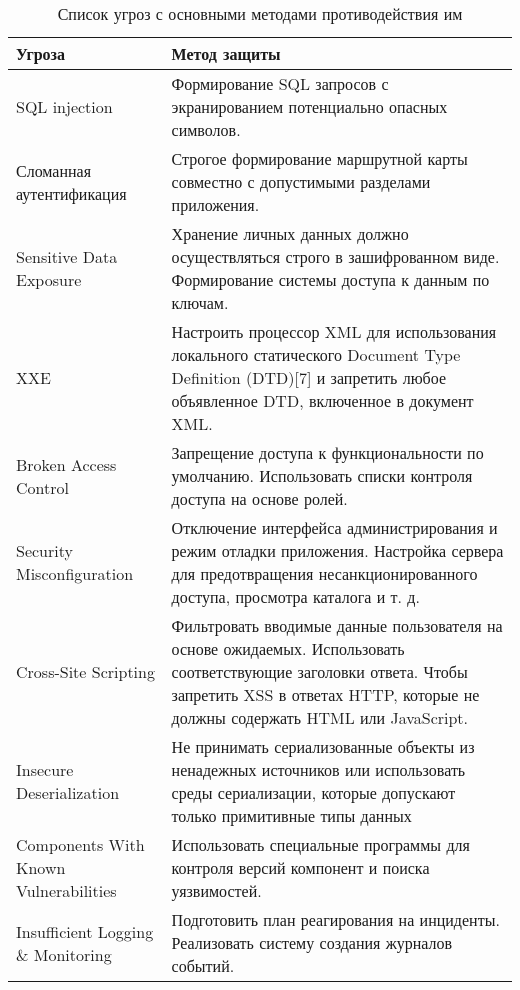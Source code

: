 \begin{table}
	\caption{Список угроз с основными методами противодействия им}
	\label{listOfRisk}
	\begin{tabularx}{\linewidth}{|p{4cm}|X|}
		\hline
		Угроза & Метод защиты \\
		\hline
		SQL injection & Формирование SQL запросов с экранированием потенциально опасных символов. \\
		\hline
		Сломанная аутентификация & Строгое формирование маршрутной карты совместно с допустимыми разделами приложения. \\
		\hline
		Sensitive Data Exposure & Хранение личных данных должно осуществляться строго в зашифрованном виде. Формирование системы доступа к данным по ключам. \\
		\hline
		XXE & Настроить процессор XML для использования локального статического Document Type Definition (DTD)[7] и запретить любое объявленное DTD, включенное в документ XML. \\
		\hline
		Broken Access Control & Запрещение доступа к функциональности по умолчанию. Использовать списки контроля доступа на основе ролей. \\
		\hline
		Security Misconfiguration & Отключение интерфейса администрирования и режим отладки приложения. Настройка сервера для предотвращения несанкционированного доступа, просмотра каталога и т. д. \\
		\hline
		Cross-Site Scripting & Фильтровать вводимые данные пользователя на основе ожидаемых. Использовать соответствующие заголовки ответа. Чтобы запретить XSS в ответах HTTP, которые не должны содержать HTML или JavaScript. \\
		\hline
		Insecure Deserialization & Не принимать сериализованные объекты из ненадежных источников или использовать среды сериализации, которые допускают только примитивные типы данных \\
		\hline
		Components With Known Vulnerabilities & Использовать специальные программы для контроля версий компонент и поиска уязвимостей. \\
		\hline
		Insufficient Logging \& Monitoring & Подготовить план реагирования на инциденты. Реализовать систему создания журналов событий. \\
		\hline
	\end{tabularx}
\end{table}

